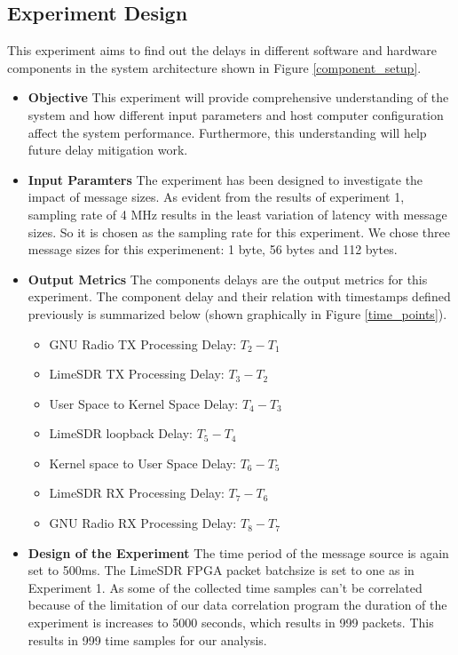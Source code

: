 \subsection{Experiment Design}
This experiment aims to find out the delays in different software and hardware components in the system architecture shown in Figure \ref{component_setup}.
\begin{itemize}
    \item {\textbf{Objective} This experiment will provide comprehensive understanding of the system and how different input parameters and host computer configuration affect the system performance.
Furthermore, this understanding will help future delay mitigation work.}
\item{\textbf{Input Paramters} The experiment has been designed to investigate the impact of message sizes.
As evident from the results of experiment 1, sampling rate of 4 MHz results in the least variation of latency with message sizes.
So it is chosen as the sampling rate for this experiment.
We chose three message sizes for this experimenent: 1 byte, 56 bytes and 112 bytes.}
\item{\textbf{Output Metrics} The components delays are the output metrics for this experiment.
The component delay and their relation with timestamps defined previously is summarized below (shown graphically in Figure \ref{time_points}).
\begin{itemize}
    \item GNU Radio TX Processing Delay: $T_2 - T_1$ 
    \item LimeSDR TX Processing Delay: $T_3 - T_2$
    \item User Space to Kernel Space Delay: $T_4 - T_3$
    \item LimeSDR loopback Delay: $T_5 - T_4$
    \item Kernel space to User Space Delay: $T_6 - T_5$
    \item LimeSDR RX Processing Delay: $T_7 - T_6$
    \item GNU Radio RX Processing Delay: $T_8 - T_7$
\end{itemize}}
\item \textbf{Design of the Experiment} The time period of the message source is again set to 500ms. 
The LimeSDR FPGA packet batchsize is set to one as in Experiment 1.
As some of the collected time samples can't be correlated because of the limitation of our data correlation program the duration of the experiment is increases to 5000 seconds, which results in 999 packets.
This results in 999 time samples for our analysis.
\end{itemize}

